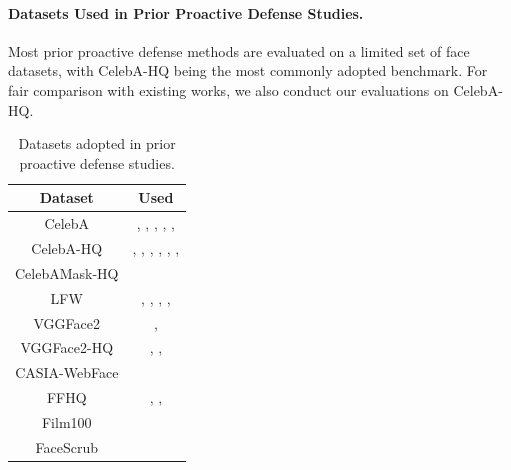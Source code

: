 \documentclass{article}
\begin{document}

\paragraph{Datasets Used in Prior Proactive Defense Studies.}
\label{appendix:dataset}
Most prior proactive defense methods are evaluated on a limited set of face datasets, with CelebA-HQ being the most commonly adopted benchmark. For fair comparison with existing works, we also conduct our evaluations on CelebA-HQ.

\begin{table}[h!]
    \caption{Datasets adopted in prior proactive defense studies.}    
    \centering
    \scriptsize
    \begin{tabular}{cc}
    \toprule
    \textbf{Dataset} & \textbf{Used} \\
    \midrule
    CelebA & \cite{ruiz2020disrupting}, \cite{wang2022anti}, \cite{huang2022cmua}, \cite{qiao2024scalable}, \cite{tang2024feature}, \cite{qu2024df}\\    
    CelebA-HQ & \cite{aneja2022tafim}, \cite{van2023anti}, \cite{shim2025leat}, \cite{lee2025scol}, \cite{wang2025faceswapguard}, \cite{jeong2025faceshield}, \cite{wang2025nullswap} \\
    CelebAMask-HQ & \cite{qu2025id}  \\
    LFW & \cite{huang2022cmua}, \cite{qiao2024scalable}, \cite{qu2024df}, \cite{wang2025nullswap}, \cite{qu2025id} \\
    VGGFace2 & \cite{van2023anti}, \cite{zhang2024dual} \\
    VGGFace2-HQ & \cite{aneja2022tafim}, \cite{jeong2025faceshield}, \cite{lee2025scol} \\ 
    CASIA-WebFace &  \cite{zhang2024dual}  \\
    FFHQ &  \cite{aneja2022tafim}, \cite{qu2024df}, \cite{qu2025id} \\
    Film100 & \cite{huang2022cmua}  \\
    FaceScrub & \cite{dong2023restricted}  \\
    \bottomrule
    \end{tabular}
    \label{tab:dataset_reference}
\end{table}
\end{document}

